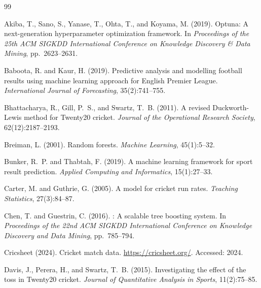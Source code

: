 \documentclass[12pt,a4paper,oneside]{report}
\begin{document}


\begin{thebibliography}{99}

Akiba, T., Sano, S., Yanase, T., Ohta, T., and Koyama, M. (2019).
\newblock Optuna: A next-generation hyperparameter optimization framework.
\newblock In \emph{Proceedings of the 25th ACM SIGKDD International Conference on Knowledge Discovery \& Data Mining}, pp.~2623--2631.

Baboota, R. and Kaur, H. (2019).
\newblock Predictive analysis and modelling football results using machine learning approach for English Premier League.
\newblock \emph{International Journal of Forecasting}, 35(2):741--755.

Bhattacharya, R., Gill, P.~S., and Swartz, T.~B. (2011).
\newblock A revised Duckworth-Lewis method for Twenty20 cricket.
\newblock \emph{Journal of the Operational Research Society}, 62(12):2187--2193.

Breiman, L. (2001).
\newblock Random forests.
\newblock \emph{Machine Learning}, 45(1):5--32.

Bunker, R.~P. and Thabtah, F. (2019).
\newblock A machine learning framework for sport result prediction.
\newblock \emph{Applied Computing and Informatics}, 15(1):27--33.

Carter, M. and Guthrie, G. (2005).
\newblock A model for cricket run rates.
\newblock \emph{Teaching Statistics}, 27(3):84--87.

Chen, T. and Guestrin, C. (2016).
: A scalable tree boosting system.
\newblock In \emph{Proceedings of the 22nd ACM SIGKDD International Conference on Knowledge Discovery and Data Mining}, pp.~785--794.

Cricsheet (2024).
\newblock Cricket match data.
\newblock \url{https://cricsheet.org/}. Accessed: 2024.

Davis, J., Perera, H., and Swartz, T.~B. (2015).
\newblock Investigating the effect of the toss in Twenty20 cricket.
\newblock \emph{Journal of Quantitative Analysis in Sports}, 11(2):75--85.


\end{thebibliography}
\end{document}
